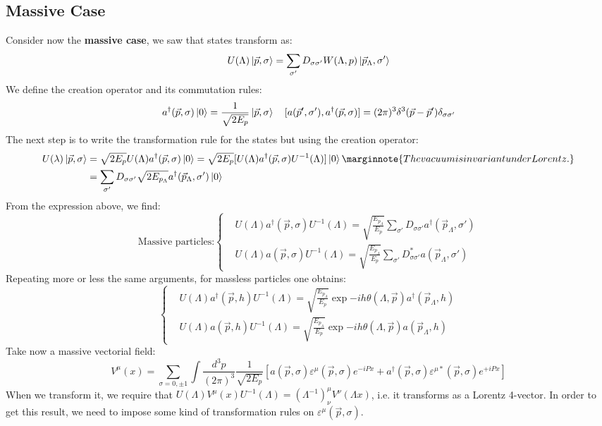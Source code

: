 \documentclass[../main.tex]{subfiles}
\begin{document}
\subsection{Massive Case}
Consider now the \textbf{massive case}, we saw that states transform as:
\[
U(\Lambda)\ket{\vec{p},\sigma}=\sum_{\sigma'}D_{\sigma\sigma'}W(\Lambda,p)\ket{\vec{p}_\Lambda,\sigma'}
\]
We define the creation operator and its commutation rules:
\[
a^\dagger(\vec{p},\sigma)\ket{0}=\frac{1}{\sqrt{2E_p}}\ket{\vec{p},\sigma} \quad [a(\vec{p}',\sigma'),a^\dagger(\vec{p},\sigma)]=(2\pi)^3\delta^3(\vec{p}-\vec{p}')\delta_{\sigma\sigma'}
\]
The next step is to write the transformation rule for the states but using the creation operator:
\begin{align*}
U(\lambda)\ket{\vec{p},\sigma}&=\sqrt{2E_p}U(\Lambda)a^\dagger(\vec{p},\sigma)\ket{0}=\sqrt{2E_p}[U(\Lambda)a^\dagger(\vec{p},\sigma)U^{-1}(\Lambda)]\ket{0}\marginnote{The vacuum is invariant under Lorentz.}\\
&=\sum_{\sigma'}D_{\sigma\sigma'}\sqrt{2E_{p_\Lambda}}a^\dagger(\vec{p}_\Lambda,\sigma')\ket{0}
\end{align*}
From the expression above, we find:
\[
\text{Massive particles:}
\left\{
\begin{aligned}
&U(\Lambda)a^\dagger(\vec{p},\sigma)U^{-1}(\Lambda)=\sqrt{\frac{E_{p_\Lambda}}{E_p}}\sum_{\sigma'}D_{\sigma\sigma'}a^\dagger(\vec{p}_\Lambda,\sigma')\\
&U(\Lambda)a(\vec{p},\sigma)U^{-1}(\Lambda)=\sqrt{\frac{E_{p_\Lambda}}{E_p}}\sum_{\sigma'}D_{\sigma\sigma'}^*a(\vec{p}_\Lambda,\sigma')
\end{aligned}
\right.
\]
Repeating more or less the same arguments, for massless particles one obtains:
\[
\left\{
\begin{aligned}
&U(\Lambda)a^\dagger(\vec{p},h)U^{-1}(\Lambda)=\sqrt{\frac{E_{p_\Lambda}}{E_p}}\exp{-ih\theta(\Lambda,\vec{p})}a^\dagger(\vec{p}_\Lambda,h)\\
&U(\Lambda)a(\vec{p},h)U^{-1}(\Lambda)=\sqrt{\frac{E_{p_\Lambda}}{E_p}}\exp{-ih\theta(\Lambda,\vec{p})}a(\vec{p}_\Lambda,h)
\end{aligned}
\right.
\]
Take now a massive vectorial field:
\[
V^\mu(x)=\sum_{\sigma=0,\pm1}\int\frac{d^3p}{(2\pi)^3}\frac{1}{\sqrt{2E_p}}\left[a(\vec{p},\sigma)\varepsilon^\mu(\vec{p},\sigma)e^{-iPx}+a^\dagger(\vec{p},\sigma)\varepsilon^{\mu*}(\vec{p},\sigma)e^{+iPx}\right]
\]
When we transform it, we require that $U(\Lambda)V^\mu(x)U^{-1}(\Lambda)=(\Lambda^{-1})^\mu_\nu V^\nu(\Lambda x)$, i.e. it transforms as a Lorentz 4-vector. In order to get this result, we need to impose some kind of transformation rules on $\varepsilon^\mu(\vec{p},\sigma)$.
\end{document}
